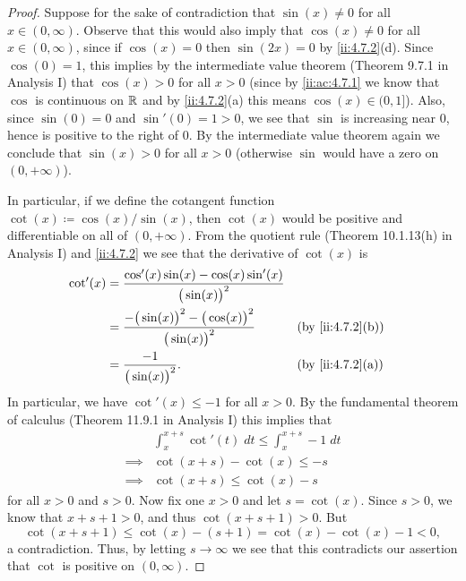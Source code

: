 \begin{proof}
  Suppose for the sake of contradiction that \(\sin(x) \neq 0\) for all \(x \in (0, \infty)\).
  Observe that this would also imply that \(\cos(x) \neq 0\) for all \(x \in (0, \infty)\), since if \(\cos(x) = 0\) then \(\sin(2x) = 0\) by \cref{ii:4.7.2}(d).
  Since \(\cos(0) = 1\), this implies by the intermediate value theorem (Theorem 9.7.1 in Analysis I) that \(\cos(x) > 0\) for all \(x > 0\)
  (since by \cref{ii:ac:4.7.1} we know that \(\cos\) is continuous on \(\mathbb{R}\) and by \cref{ii:4.7.2}(a) this means \(\cos(x) \in (0, 1]\)).
  Also, since \(\sin(0) = 0\) and \(\sin'(0) = 1 > 0\), we see that \(\sin\) is increasing near \(0\), hence is positive to the right of \(0\).
  By the intermediate value theorem again we conclude that \(\sin(x) > 0\) for all \(x > 0\)
  (otherwise \(\sin\) would have a zero on \((0, +\infty)\)).

  In particular, if we define the cotangent function \(\cot(x) \coloneqq \cos(x) / \sin(x)\), then \(\cot(x)\) would be positive and differentiable on all of \((0, +\infty)\).
  From the quotient rule (Theorem 10.1.13(h) in Analysis I) and \cref{ii:4.7.2} we see that the derivative of \(\cot(x)\) is
  \begin{align*}
    \cot'(x) & = \dfrac{\cos'(x) \sin(x) - \cos(x) \sin'(x)}{\big(\sin(x)\big)^2}                              \\
             & = \dfrac{-\big(\sin(x)\big)^2 - \big(\cos(x)\big)^2}{\big(\sin(x)\big)^2} &  & \by{ii:4.7.2}[b] \\
             & = \dfrac{-1}{\big(\sin(x)\big)^2}.                                        &  & \by{ii:4.7.2}[a]
  \end{align*}
  In particular, we have \(\cot'(x) \leq -1\) for all \(x > 0\).
  By the fundamental theorem of calculus (Theorem 11.9.1 in Analysis I) this implies that
  \begin{align*}
             & \int_x^{x + s} \cot'(t) \; dt \leq \int_x^{x + s} -1 \; dt \\
    \implies & \cot(x + s) - \cot(x) \leq -s                              \\
    \implies & \cot(x + s) \leq \cot(x) - s
  \end{align*}
  for all \(x > 0\) and \(s > 0\).
  Now fix one \(x > 0\) and let \(s = \cot(x)\).
  Since \(s > 0\), we know that \(x + s + 1 > 0\), and thus \(\cot(x + s + 1) > 0\).
  But
  \[
    \cot(x + s + 1) \leq \cot(x) - (s + 1) = \cot(x) - \cot(x) - 1 < 0,
  \]
  a contradiction.
  Thus, by letting \(s \to \infty\) we see that this contradicts our assertion that \(\cot\) is positive on \((0, \infty)\).
\end{proof}

